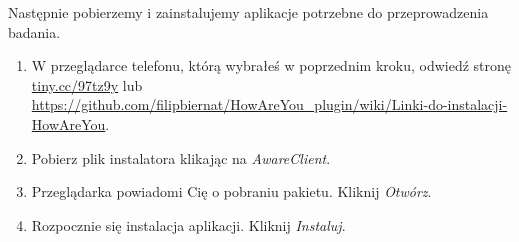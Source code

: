 Następnie pobierzemy i zainstalujemy aplikacje potrzebne do przeprowadzenia badania.

\begin{enumerate}
	
	\item W przeglądarce telefonu, którą wybrałeś w poprzednim kroku, odwiedź stronę \url{tiny.cc/97tz9y} lub \url{https://github.com/filipbiernat/HowAreYou_plugin/wiki/Linki-do-instalacji-HowAreYou}.
	
	\item Pobierz plik instalatora klikając na \textit{AwareClient}.
	
	\item Przeglądarka powiadomi Cię o pobraniu pakietu. Kliknij \textit{Otwórz}. 
	
	\item Rozpocznie się instalacja aplikacji. Kliknij \textit{Instaluj}.
	

\end{enumerate}
